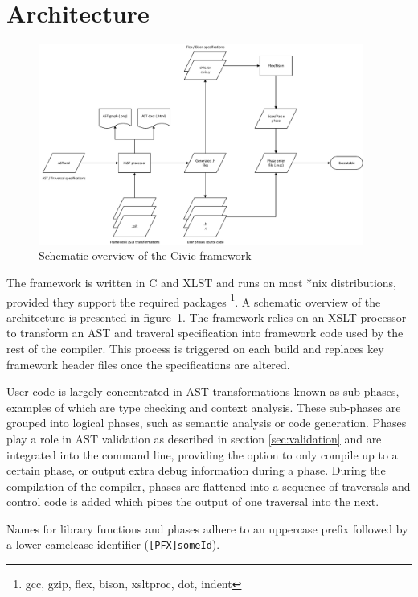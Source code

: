 \documentclass[twoside,openright]{uva-bachelor-thesis}
\newcommand{\code}[1]{\texttt{\footnotesize#1}}
\begin{document}
	\section{Architecture}
		\begin{figure}[H]
			\centering
			\includegraphics[width=0.95\textwidth]{figures/architecture/overview.pdf}
			\caption{Schematic overview of the Civic framework}
			\label{fig:build-dep}
		\end{figure}
	
		The framework is written in C and XLST and runs on most *nix distributions, provided they support the required packages \footnote{gcc, gzip, flex, bison, xsltproc, dot, indent}. A schematic overview of the architecture is presented in figure~\ref{fig:build-dep}. The framework relies on an XSLT processor to transform an AST and traveral specification into framework code used by the rest of the compiler. This process is triggered on each build and replaces key framework header files once the specifications are altered.
		
		User code is largely concentrated in AST transformations known as sub-phases, examples of which are type checking and context analysis. These sub-phases are grouped into logical phases, such as semantic analysis or code generation. Phases play a role in AST validation as described in section \ref{sec:validation} and are integrated into the command line, providing the option to only compile up to a certain phase, or output extra debug information during a phase. During the compilation of the compiler, phases are flattened into a sequence of traversals and control code is added which pipes the output of one traversal into the next.
		
		Names for library functions and phases adhere to an uppercase prefix followed by a lower camelcase identifier (\code{[PFX]someId}).
		
\end{document}
